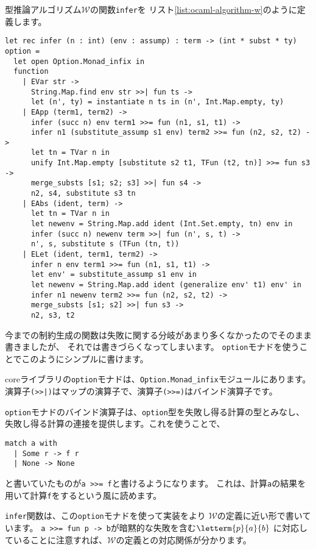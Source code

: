 型推論アルゴリズム$\mathcal W$の関数\texttt{infer}を
リスト\ref{list:ocaml-algorithm-w}のように定義します。

\begin{lstlisting}[caption=型推論アルゴリズム$\mathcal W$の実装, label=list:ocaml-algorithm-w]
let rec infer (n : int) (env : assump) : term -> (int * subst * ty) option =
  let open Option.Monad_infix in
  function
    | EVar str ->
      String.Map.find env str >>| fun ts ->
      let (n', ty) = instantiate n ts in (n', Int.Map.empty, ty)
    | EApp (term1, term2) ->
      infer (succ n) env term1 >>= fun (n1, s1, t1) ->
      infer n1 (substitute_assump s1 env) term2 >>= fun (n2, s2, t2) ->
      let tn = TVar n in
      unify Int.Map.empty [substitute s2 t1, TFun (t2, tn)] >>= fun s3 ->
      merge_substs [s1; s2; s3] >>| fun s4 ->
      n2, s4, substitute s3 tn
    | EAbs (ident, term) ->
      let tn = TVar n in
      let newenv = String.Map.add ident (Int.Set.empty, tn) env in
      infer (succ n) newenv term >>| fun (n', s, t) ->
      n', s, substitute s (TFun (tn, t))
    | ELet (ident, term1, term2) ->
      infer n env term1 >>= fun (n1, s1, t1) ->
      let env' = substitute_assump s1 env in
      let newenv = String.Map.add ident (generalize env' t1) env' in
      infer n1 newenv term2 >>= fun (n2, s2, t2) ->
      merge_substs [s1; s2] >>| fun s3 ->
      n2, s3, t2
\end{lstlisting}

今までの制約生成の関数は失敗に関する分岐があまり多くなかったのでそのまま書きましたが、
それでは書きづらくなってしまいます。
\texttt{option}モナドを使うことでこのようにシンプルに書けます。

coreライブラリの\texttt{option}モナドは、\texttt{Option.Monad\_infix}モジュールにあります。
演算子\texttt{(>>|)}はマップの演算子で、演算子\texttt{(>>=)}はバインド演算子です。

\texttt{option}モナドのバインド演算子は、\texttt{option}型を失敗し得る計算の型とみなし、
失敗し得る計算の連接を提供します。これを使うことで、
\begin{lstlisting}
match a with
  | Some r -> f r
  | None -> None
\end{lstlisting}
と書いていたものが\texttt{a >>= f}と書けるようになります。
これは、計算\texttt{a}の結果を用いて計算\texttt{f}をするという風に読めます。

\texttt{infer}関数は、この\texttt{option}モナドを使って実装をより
$\mathcal W$の定義に近い形で書いています。
\texttt{a >>= fun p -> b}が暗黙的な失敗を含む$\letterm{p}{a}{b}$
に対応していることに注意すれば、$\mathcal W$の定義との対応関係が分かります。

